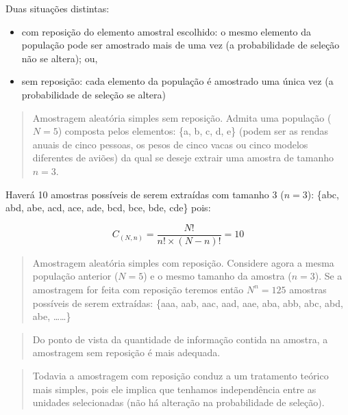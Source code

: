 \documentclass[
]{book}
\providecommand{\tightlist}{%
  \setlength{\itemsep}{0pt}\setlength{\parskip}{0pt}}
\begin{document}
\hfill\break

Duas situações distintas:

\hfill\break

\begin{itemize}
\tightlist
\item
  com reposição do elemento amostral escolhido: o mesmo elemento da população pode ser amostrado mais de uma vez (a probabilidade de seleção não se altera); ou,
\item
  sem reposição: cada elemento da população é amostrado uma única vez (a probabilidade de seleção se altera)
\end{itemize}

\hfill\break

\begin{quote}
Amostragem aleatória simples sem reposição. Admita uma população (\(N=5\)) composta pelos elementos: \{a, b, c, d, e\} (podem ser as rendas anuais de cinco pessoas, os pesos de cinco vacas ou cinco modelos diferentes de aviões) da qual se deseje extrair uma amostra de tamanho \(n=3\).
\end{quote}

\hfill\break

Haverá 10 amostras possíveis de serem extraídas com tamanho 3 (\(n=3\)): \{abc, abd, abe, acd, ace, ade, bcd, bce, bde, cde\} pois:

\hfill\break

\[
C_{(N,n)} = \frac{ N! }{ n! \times ( N-n)!}=10
\]

\hfill\break

\begin{quote}
Amostragem aleatória simples com reposição. Considere agora a mesma população anterior (\(N=5\)) e o mesmo tamanho da amostra (\(n=3\)). Se a amostragem for feita com reposição teremos então \(N^{n}=125\) amostras possíveis de serem extraídas: \{aaa, aab, aac, aad, aae, aba, abb, abc, abd, abe, \ldots\ldots\}
\end{quote}

\hfill\break

\begin{quote}
Do ponto de vista da quantidade de informação contida na amostra, a amostragem sem reposição é mais adequada.
\end{quote}

\hfill\break

\begin{quote}
Todavia a amostragem com reposição conduz a um tratamento teórico mais simples, pois ele implica que tenhamos independência entre as unidades selecionadas (não há alteração na probabilidade de seleção).
\end{quote}
\end{document}
